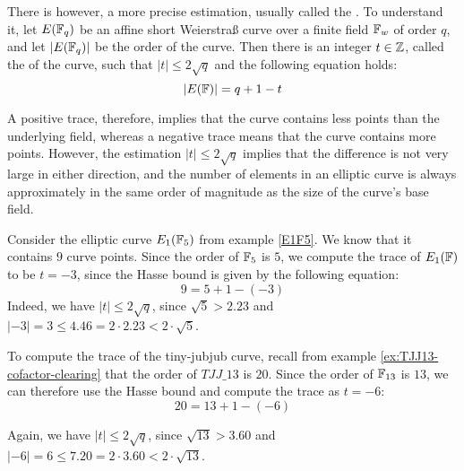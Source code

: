 There is however, a more precise estimation, usually called the . To understand it, let $E(\mathbb{F}_q)$ be an affine short Weierstraß curve over a finite field $\mathbb{F}_w$ of order $q$, and let $|E(\mathbb{F}_q)|$ be the order of the curve. Then there is an integer $t\in \mathbb{Z}$, called the  of the curve, such that $|t| \leq 2\sqrt{q}$ and the following equation holds:
\begin{equation}\label{hasse-bound}
|E(\mathbb{F})| = q +1 -t
\end{equation}

A positive trace, therefore, implies that the curve contains less points than the underlying field, whereas a negative trace means that the curve contains more points. However, the estimation $|t| \leq 2\sqrt{q}$ implies that the difference is not very large in either direction, and the number of elements in an elliptic curve is always approximately in the same order of magnitude as the size of the curve's base field.

\begin{example}\label{ex:E1F5-frobenius} Consider the elliptic curve $E_1(\mathbb{F}_5)$ from example \ref{E1F5}. We know that it contains $9$ curve points. Since the order of $\mathbb{F}_5$ is $5$, we compute the trace of $E_1(\mathbb{F})$ to be $t=-3$, since the Hasse bound is given by the following equation:
$$
9 = 5 + 1 - (-3)
$$
Indeed, we have $|t| \leq 2\sqrt{q}$, since $\sqrt{5}> 2.23$ and 
$|-3|= 3 \leq 4.46 = 2\cdot 2.23< 2\cdot \sqrt{5}$.
\end{example}

\begin{example}\label{ex:TJJ13-frobenius} To compute the trace of the tiny-jubjub curve, recall from example \ref{ex:TJJ13-cofactor-clearing} that the order of $\mathit{TJJ\_13}$ is $20$. Since the order of $\mathbb{F}_{13}$ is $13$, we can therefore use the Hasse bound and compute the trace as $t=-6$:
\begin{equation}
20 = 13 + 1 - (-6)
\end{equation}

Again, we have $|t| \leq 2\sqrt{q}$, since $\sqrt{13}> 3.60$ and 
$|-6|= 6 \leq 7.20 = 2\cdot 3.60< 2\cdot \sqrt{13}$.
\end{example}

